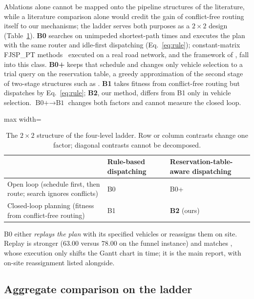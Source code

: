\documentclass[preprint,review,12pt,authoryear,doubleblind]{elsarticle}
\begin{document}
Ablations alone cannot be mapped onto the pipeline structures of the literature, while a literature comparison alone would credit the gain of conflict-free routing itself to our mechanisms; the ladder serves both purposes as a $2\times2$ design (Table~\ref{tab:arms}).
\textbf{B0} searches on unimpeded shortest-path times and executes the plan with the same router and idle-first dispatching (Eq.~\eqref{eq:rule}); constant-matrix FJSP\_PT methods~\citep{meng2025cp,qin2026knowledge,jafarian2026integrated} executed on a real road network, and the framework of \citet{li2026framework}, fall into this class.
\textbf{B0+} keeps that schedule and changes only vehicle selection to a trial query on the reservation table, a greedy approximation of the second stage of two-stage structures such as \citet{sun2023integrated}.
\textbf{B1} takes fitness from conflict-free routing but dispatches by Eq.~\eqref{eq:rule}; \textbf{B2}, our method, differs from B1 only in vehicle selection.
$\text{B0+}\to\text{B1}$ changes both factors and cannot measure the closed loop.

\begin{table}[!htbp]
\caption{The $2\times2$ structure of the four-level ladder. Row or column contrasts change one factor; diagonal contrasts cannot be decomposed.}
\label{tab:arms}
\footnotesize
\begin{adjustbox}{max width=\linewidth}\begin{tabular}{@{}>{\raggedright\arraybackslash}p{6.4cm}>{\centering\arraybackslash}p{2.6cm}>{\centering\arraybackslash}p{3.2cm}@{}}
\toprule
 & Rule-based dispatching & Reservation-table-aware dispatching \\
\midrule
Open loop (schedule first, then route; search ignores conflicts) & B0 & B0+ \\
Closed-loop planning (fitness from conflict-free routing) & B1 & \textbf{B2} (ours) \\
\bottomrule
\end{tabular}\end{adjustbox}
\end{table}

B0 either \emph{replays the plan} with its specified vehicles or reassigns them on site. Replay is stronger ($63.00$ versus $78.00$ on the funnel instance) and matches \citet{li2026framework}, whose execution only shifts the Gantt chart in time; it is the main report, with on-site reassignment listed alongside.

\subsection{Aggregate comparison on the ladder}
\label{sec:main}
\end{document}
